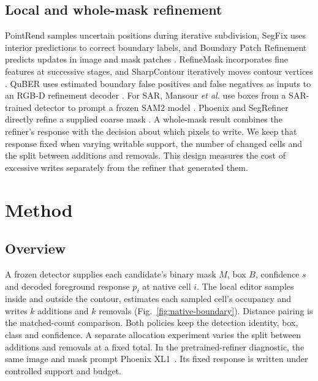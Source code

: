 \documentclass[journal]{IEEEtran}
\begin{document}
\subsection{Local and whole-mask refinement}
PointRend samples uncertain positions during iterative subdivision, SegFix uses interior predictions to correct boundary labels, and Boundary Patch Refinement predicts updates in image and mask patches \cite{pointrend,segfix,bpr}. RefineMask incorporates fine features at successive stages, and SharpContour iteratively moves contour vertices \cite{refinemask,sharpcontour}. QuBER uses estimated boundary false positives and false negatives as inputs to an RGB-D refinement decoder \cite{quber}. For SAR, Mansour \emph{et al.} use boxes from a SAR-trained detector to prompt a frozen SAM2 model \cite{mansour2026}. Phoenix and SegRefiner directly refine a supplied coarse mask \cite{phoenix,segrefiner}. A whole-mask result combines the refiner's response with the decision about which pixels to write. We keep that response fixed when varying writable support, the number of changed cells and the split between additions and removals. This design measures the cost of excessive writes separately from the refiner that generated them.

\section{Method}
\label{sec:method}

\subsection{Overview}
A frozen detector supplies each candidate's binary mask \(M\), box \(B\), confidence \(s\) and decoded foreground response \(p_i\) at native cell \(i\). The local editor samples inside and outside the contour, estimates each sampled cell's occupancy and writes \(k\) additions and \(k\) removals (Fig.~\ref{fig:native-boundary}). Distance pairing is the matched-count comparison. Both policies keep the detection identity, box, class and confidence. A separate allocation experiment varies the split between additions and removals at a fixed total. In the pretrained-refiner diagnostic, the same image and mask prompt Phoenix XL1~\cite{phoenix}. Its fixed response is written under controlled support and budget.
\end{document}
